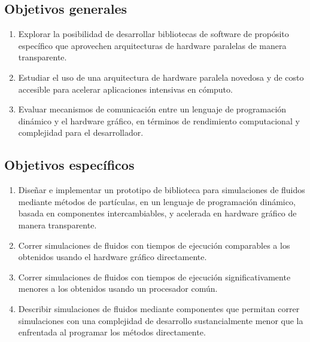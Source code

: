 \documentclass[11pt,spanish]{article}
\begin{document}
\subsection{Objetivos generales}
\begin{enumerate}
    \item Explorar la posibilidad de desarrollar bibliotecas de software de
        propósito específico que aprovechen arquitecturas de hardware paralelas
        de manera transparente.
    \item Estudiar el uso de una arquitectura de hardware paralela novedosa y de
        costo accesible para acelerar aplicaciones intensivas en cómputo.
    \item Evaluar mecanismos de comunicación entre un lenguaje de programación
        dinámico y el hardware gráfico, en términos de rendimiento computacional y
        complejidad para el desarrollador.
\end{enumerate}

\subsection{Objetivos específicos}
\begin{enumerate}
   \item Diseñar e implementar un prototipo de biblioteca
       para simulaciones de fluidos mediante métodos de partículas,
       en un lenguaje de programación dinámico,
       basada en componentes intercambiables,
       y acelerada en hardware gráfico de manera transparente.
   \item Correr simulaciones de fluidos con tiempos de ejecución comparables a los
       obtenidos usando el hardware gráfico directamente.
   \item Correr simulaciones de fluidos con tiempos de ejecución
       significativamente menores
       a los obtenidos usando un procesador común.
   \item Describir simulaciones de fluidos mediante componentes que permitan
       correr simulaciones con una complejidad de desarrollo sustancialmente
       menor que la enfrentada al programar los métodos directamente.
\end{enumerate}

\newpage
\end{document}
